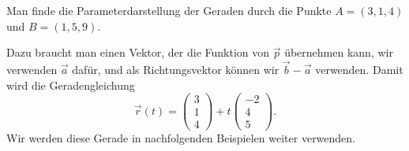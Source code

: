 \begin{beispiel}
Man finde die Parameterdarstellung der Geraden durch die Punkte
$A=(3,1,4)$ und $B=(1,5,9)$.

\smallskip

{\parindent 0pt
Dazu} braucht man einen Vektor, der die Funktion von $\vec p$ übernehmen
kann, wir verwenden $\vec{a}$ dafür, und als
Richtungsvektor können wir $\vec{b}-\vec{a}$ verwenden.
Damit wird die Geradengleichung
\begin{equation}
\vec r(t) =
\begin{pmatrix}3\\1\\4 \end{pmatrix}
+t
\begin{pmatrix}-2\\4\\5\end{pmatrix}.
\label{pigerade}
\end{equation}
Wir werden diese Gerade in nachfolgenden Beispielen weiter verwenden.
\end{beispiel}


